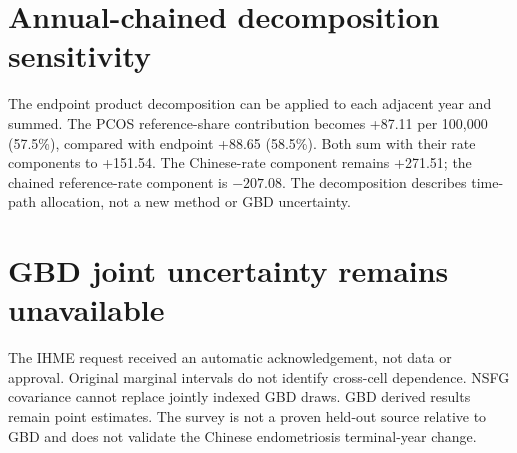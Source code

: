 \section{Annual-chained decomposition sensitivity}
The endpoint product decomposition can be applied to each adjacent year and summed. The PCOS reference-share contribution becomes +87.11 per 100,000 (57.5\%), compared with endpoint +88.65 (58.5\%). Both sum with their rate components to +151.54. The Chinese-rate component remains +271.51; the chained reference-rate component is $-207.08$. The decomposition describes time-path allocation, not a new method or GBD uncertainty.

\section{GBD joint uncertainty remains unavailable}
The IHME request received an automatic acknowledgement, not data or approval. Original marginal intervals do not identify cross-cell dependence. NSFG covariance cannot replace jointly indexed GBD draws. GBD derived results remain point estimates. The survey is not a proven held-out source relative to GBD and does not validate the Chinese endometriosis terminal-year change.
